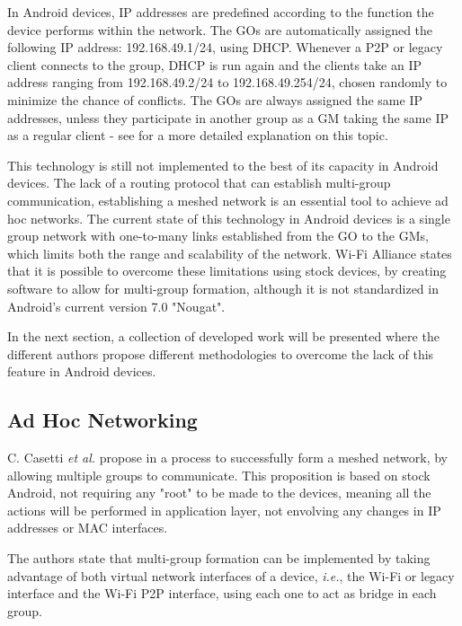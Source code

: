 In Android devices, \gls{IP} addresses are predefined according to the function the device performs within the network. The \glspl{GO} are automatically assigned the following \gls{IP} address: 192.168.49.1/24, using \gls{DHCP}. Whenever a P2P or legacy client connects to the group, \gls{DHCP} is run again and the clients take an \gls{IP} address ranging from 192.168.49.2/24 to 192.168.49.254/24, chosen randomly to minimize the chance of conflicts. The \glspl{GO} are always assigned the same \gls{IP} addresses, unless they participate in another group as a \gls{GM} taking the same \gls{IP} as a regular client - see \cite{routeMultiGroup} for a more detailed explanation on this topic.

This technology is still not implemented to the best of its capacity in Android devices. The lack of a routing protocol that can establish multi-group communication, establishing a meshed network is an essential tool to achieve ad hoc networks. The current state of this technology in Android devices is a single group network with one-to-many links established from the \gls{GO} to the \glspl{GM}, which limits both the range and scalability of the network. Wi-Fi Alliance states that it is possible to overcome these limitations using stock devices, by creating software to allow for multi-group formation, although it is not standardized in Android's current version 7.0 "Nougat".

In the next section, a collection of developed work will be presented where the different authors propose different methodologies to overcome the lack of this feature in Android devices.

\subsection{Ad Hoc Networking}
\label{subsection:adhocnet}

C. Casetti \textit{et al.} propose in \cite{routeMultiGroup} a process to successfully form a meshed network, by allowing multiple groups to communicate. This proposition is based on stock Android, not requiring any "root" to be made to the devices, meaning all the actions will be performed in application layer, not envolving any changes in \gls{IP} addresses or \gls{MAC} interfaces.

The authors state that multi-group formation can be implemented by taking advantage of both virtual network interfaces of a device, \textit{i.e.}, the Wi-Fi or legacy interface and the Wi-Fi P2P interface, using each one to act as bridge in each group.

